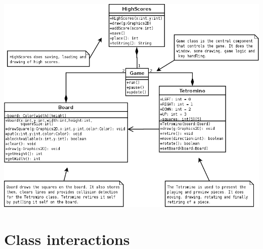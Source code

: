 \documentclass[11pt,a4paper]{article}
\begin{document}
\vspace{3mm}
\begin{center}
  \includegraphics[scale=0.4]{class_diagram.png}
\end{center}

\newpage

\section {Class interactions}
\end{document}
